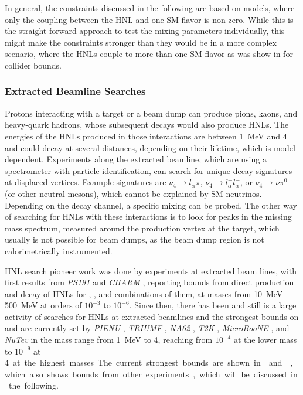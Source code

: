 In general, the constraints discussed in the following are based on models, where only the coupling between the HNL and one SM flavor is non-zero. While this is the straight forward approach to test the mixing parameters individually, this might make the constraints stronger than they would be in a more complex scenario, where the HNLs couple to more than one SM flavor as was show in  for collider bounds.


\subsubsection{Extracted Beamline Searches}

Protons interacting with a target or a beam dump can produce pions, kaons, and heavy-quark hadrons, whose subsequent decays would also produce HNLs. The energies of the HNLs produced in those interactions are between \SI{1}{\mega\electronvolt} and \SI{4}{\gev} and could decay at several distances, depending on their lifetime, which is model dependent. Experiments along the extracted beamline, which are using a spectrometer with particle identification, can search for unique decay signatures at displaced vertices. Example signatures are $\nu_4 \rightarrow l_\alpha \pi$, $\nu_4 \rightarrow l^+_\alpha l^-_\alpha$, or $\nu_4 \rightarrow \nu \pi^0$ (or other neutral mesons), which cannot be explained by SM neutrinos. Depending on the decay channel, a specific mixing can be probed. The other way of searching for HNLs with these interactions is to look for peaks in the missing mass spectrum, measured around the production vertex at the target, which usually is not possible for beam dumps, as the beam dump region is not calorimetrically instrumented.

HNL search pioneer work was done by experiments at extracted beam lines, with first results from \textit{PS191}  and \textit{CHARM} , reporting bounds from direct production and decay of HNLs for , , and combinations of them, at masses from \SIrange{10}{500}{\mega\electronvolt} at orders of $10^{-3}$ to $10^{-6}$. Since then, there has been and still is a large activity of searches for HNLs at extracted beamlines and the strongest bounds on  and  are currently set by \textit{PIENU} , \textit{TRIUMF} , \textit{NA62} , \textit{T2K} , \textit{MicroBooNE} , and \textit{NuTev}  in the mass range from \SI{1}{\mega\electronvolt} to \SI{4}{\gev}, reaching from $10^{-4}$ at the lower mass to $10^{-9}$ at \SI{4} at the highest masses. The current strongest bounds are shown in  and , which also shows bounds from other experiments, which will be discussed in the following.

